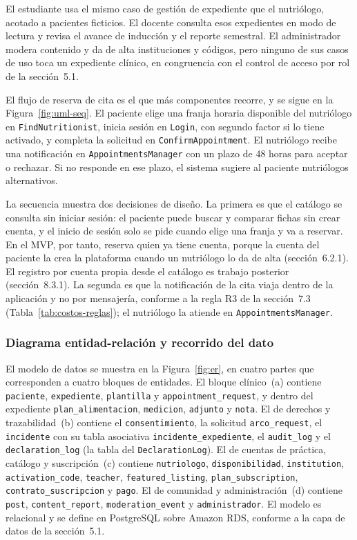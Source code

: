 \documentclass[12pt, a4paper]{article}
\begin{document}
El estudiante usa el mismo caso de gestión de expediente que el
nutriólogo, acotado a pacientes ficticios. El docente consulta esos
expedientes en modo de lectura y revisa el avance de inducción y el
reporte semestral. El administrador modera contenido y da de alta
instituciones y códigos, pero ninguno de sus casos de uso toca un
expediente clínico, en congruencia con el control de acceso por rol de
la sección~5.1.

El flujo de reserva de cita es el que más componentes recorre, y se
sigue en la Figura~\ref{fig:uml-seq}. El paciente elige una franja
horaria disponible del nutriólogo en \texttt{FindNutritionist}, inicia
sesión en \texttt{Login}, con segundo factor si lo tiene activado, y
completa la solicitud en \texttt{ConfirmAppointment}. El nutriólogo
recibe una notificación en \texttt{AppointmentsManager} con un plazo de
48 horas para aceptar o rechazar. Si no responde en ese plazo, el
sistema sugiere al paciente nutriólogos alternativos.

La secuencia muestra dos decisiones de diseño. La primera es que el
catálogo se consulta sin iniciar sesión: el paciente puede buscar y
comparar fichas sin crear cuenta, y el inicio de sesión solo se pide
cuando elige una franja y va a reservar. En el MVP, por tanto, reserva quien ya tiene cuenta,
porque la cuenta del paciente la crea la plataforma cuando un
nutriólogo lo da de alta (sección~6.2.1). El registro por cuenta
propia desde el catálogo es trabajo posterior (sección~8.3.1). La
segunda es que la notificación de la cita viaja
dentro de la aplicación y no por mensajería, conforme a la regla R3 de
la sección~7.3 (Tabla~\ref{tab:costos-reglas}); el nutriólogo la atiende
en \texttt{AppointmentsManager}.

\subsubsection{Diagrama entidad-relación y recorrido del dato}

\begin{sloppypar}
El modelo de datos se muestra en la Figura~\ref{fig:er}, en cuatro
partes que corresponden a cuatro bloques de entidades. El bloque
clínico~(a) contiene \texttt{paciente}, \texttt{expediente},
\texttt{plantilla} y \texttt{appointment\_request}, y dentro del expediente
\texttt{plan\_alimentacion}, \texttt{medicion}, \texttt{adjunto} y
\texttt{nota}. El de derechos y trazabilidad~(b) contiene el
\texttt{consentimiento}, la solicitud \texttt{arco\_request}, el
\texttt{incidente} con su tabla asociativa
\texttt{incidente\_expediente}, el \texttt{audit\_log} y el
\texttt{declaration\_log} (la tabla del \texttt{DeclarationLog}). El de cuentas de
práctica, catálogo y suscripción~(c) contiene \texttt{nutriologo},
\texttt{disponibilidad}, \texttt{institution},
\texttt{activation\_code}, \texttt{teacher}, \texttt{featured\_listing},
\texttt{plan\_subscription}, \texttt{contrato\_suscripcion} y
\texttt{pago}. El de comunidad y administración~(d) contiene
\texttt{post}, \texttt{content\_report}, \texttt{moderation\_event} y
\texttt{administrador}. El modelo es relacional y se define en
PostgreSQL sobre Amazon RDS, conforme a la capa de datos de la
sección~5.1.
\end{sloppypar}
 
\end{document}
